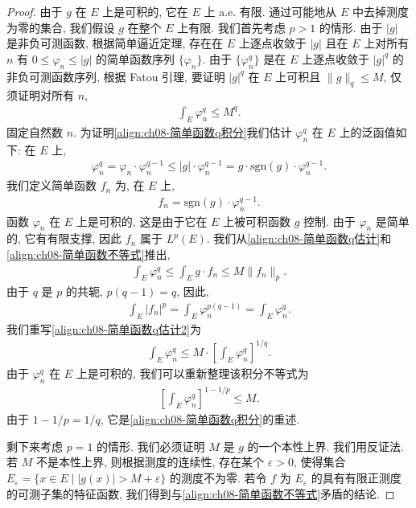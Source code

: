 \documentclass[../../main.tex]{subfiles}
\begin{document}
\begin{proof}
由于 $g$ 在 $E$ 上是可积的, 它在 $E$ 上 a.e. 有限. 通过可能地从 $E$ 中去掉测度为零的集合, 我们假设 $g$ 在整个 $E$ 上有限. 我们首先考虑 $p>1$ 的情形. 由于 $|g|$ 是非负可测函数, 根据简单逼近定理, 存在在 $E$ 上逐点收敛于 $|g|$ 且在 $E$ 上对所有 $n$ 有 $0\leqslant\varphi_{n}\leqslant|g|$ 的简单函数序列 $\{\varphi_{n}\}$. 由于 $\{\varphi_{n}^{q}\}$ 是在 $E$ 上逐点收敛于 $|g|^{q}$ 的非负可测函数序列, 根据 Fatou 引理, 要证明 $|g|^{q}$ 在 $E$ 上可积且 $\|g\|_{q}\leqslant M$, 仅须证明对所有 $n$,
\begin{align}
\int_{E}\varphi_{n}^{q}\leqslant M^{q}.\label{align:ch08-简单函数q积分}
\end{align}
固定自然数 $n$. 为证明\eqref{align:ch08-简单函数q积分}我们估计 $\varphi_{n}^{q}$ 在 $E$ 上的泛函值如下: 在 $E$ 上,
\begin{align}
\varphi_{n}^{q}=\varphi_{n}\cdot\varphi_{n}^{q-1}\leqslant|g|\cdot\varphi_{n}^{q-1}=g\cdot\mathrm{sgn}(g)\cdot\varphi_{n}^{q-1}.\label{align:ch08-简单函数q估计}
\end{align}
我们定义简单函数 $f_{n}$ 为, 在 $E$ 上,
\begin{align*}
f_{n}=\mathrm{sgn}(g)\cdot\varphi_{n}^{q-1}.
\end{align*}
函数 $\varphi_{n}$ 在 $E$ 上是可积的, 这是由于它在 $E$ 上被可积函数 $g$ 控制. 由于 $\varphi_{n}$ 是简单的, 它有有限支撑, 因此 $f_{n}$ 属于 $L^{p}(E)$. 我们从\eqref{align:ch08-简单函数q估计}和\eqref{align:ch08-简单函数不等式}推出,
\begin{align}
\int_{E}\varphi_{n}^{q}\leqslant\int_{E}g\cdot f_{n}\leqslant M\|f_{n}\|_{p}.\label{align:ch08-简单函数q估计2}
\end{align}
由于 $q$ 是 $p$ 的共轭, $p(q-1)=q$, 因此,
\begin{align*}
\int_{E}|f_{n}|^{p}=\int_{E}\varphi_{n}^{p(q-1)}=\int_{E}\varphi_{n}^{q}.
\end{align*}
我们重写\eqref{align:ch08-简单函数q估计2}为
\begin{align*}
\int_{E}\varphi_{n}^{q}\leqslant M\cdot\left[\int_{E}\varphi_{n}^{q}\right]^{1/q}.
\end{align*}
由于 $\varphi_{n}^{q}$ 在 $E$ 上是可积的, 我们可以重新整理该积分不等式为
\begin{align*}
\left[\int_{E}\varphi_{n}^{q}\right]^{1-1/p}\leqslant M.
\end{align*}
由于 $1-1/p=1/q$, 它是\eqref{align:ch08-简单函数q积分}的重述.

剩下来考虑 $p=1$ 的情形. 我们必须证明 $M$ 是 $g$ 的一个本性上界. 我们用反证法. 若 $M$ 不是本性上界, 则根据测度的连续性, 存在某个 $\varepsilon>0$, 使得集合 $E_{\varepsilon}=\{x\in E\mid|g(x)|>M+\varepsilon\}$ 的测度不为零. 若令 $f$ 为 $E_{\varepsilon}$ 的具有有限正测度的可测子集的特征函数, 我们得到与\eqref{align:ch08-简单函数不等式}矛盾的结论.
\end{proof}
\end{document}
